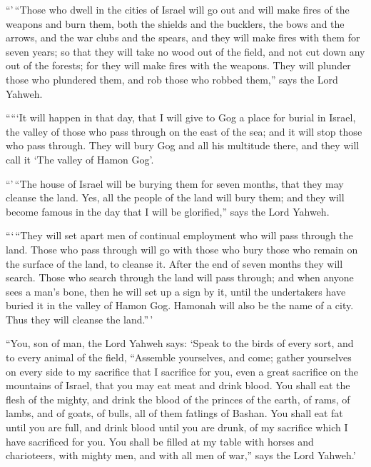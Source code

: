  ``'\,``Those who dwell in the cities of Israel will go
out and will make fires of the weapons and burn them, both the shields
and the bucklers, the bows and the arrows, and the war clubs and the
spears, and they will make fires with them for seven years;
 so that they will take no wood out of the field, and not
cut down any out of the forests; for they will make fires with the
weapons. They will plunder those who plundered them, and rob those who
robbed them,'' says the Lord Yahweh.

 `````It will happen in that day, that I will give to Gog
a place for burial in Israel, the valley of those who pass through on
the east of the sea; and it will stop those who pass through. They will
bury Gog and all his multitude there, and they will call it `The valley
of Hamon Gog'.

 ``'\,``The house of Israel will be burying them for
seven months, that they may cleanse the land.  Yes, all
the people of the land will bury them; and they will become famous in
the day that I will be glorified,'' says the Lord Yahweh.

 ```\,``They will set apart men of continual employment
who will pass through the land. Those who pass through will go with
those who bury those who remain on the surface of the land, to cleanse
it. After the end of seven months they will search. 
Those who search through the land will pass through; and when anyone
sees a man's bone, then he will set up a sign by it, until the
undertakers have buried it in the valley of Hamon Gog. 
Hamonah will also be the name of a city. Thus they will cleanse the
land.''\,'

 ``You, son of man, the Lord Yahweh says: `Speak to the
birds of every sort, and to every animal of the field, ``Assemble
yourselves, and come; gather yourselves on every side to my sacrifice
that I sacrifice for you, even a great sacrifice on the mountains of
Israel, that you may eat meat and drink blood.  You shall
eat the flesh of the mighty, and drink the blood of the princes of the
earth, of rams, of lambs, and of goats, of bulls, all of them fatlings
of Bashan.  You shall eat fat until you are full, and
drink blood until you are drunk, of my sacrifice which I have sacrificed
for you.  You shall be filled at my table with horses and
charioteers, with mighty men, and with all men of war,'' says the Lord
Yahweh.'


